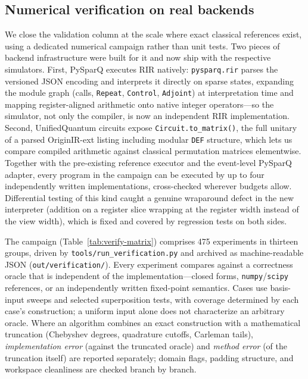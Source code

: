 \begin{table}[t]
\begin{tabular}{@{}p{4.3cm}cccc@{}}
  \end{tabular}
\end{table}

\subsection{Numerical verification on real backends}
\label{sec:numverify}

We close the validation column at the scale where exact classical
references exist, using a dedicated numerical campaign rather than unit
tests.  Two pieces of backend infrastructure were built for it and now ship
with the respective simulators.  First, PySparQ executes RIR natively:
\texttt{pysparq.rir} parses the versioned JSON encoding and interprets it
directly on sparse states, expanding the module graph (calls,
\texttt{Repeat}, \texttt{Control}, \texttt{Adjoint}) at interpretation time
and mapping register-aligned arithmetic onto native integer operators---so
the simulator, not only the compiler, is now an independent RIR
implementation.  Second, UnifiedQuantum circuits expose
\texttt{Circuit.to\_matrix()}, the full unitary of a parsed OriginIR-ext
listing including modular \texttt{DEF} structure, which lets us compare
compiled arithmetic against classical permutation matrices elementwise.
Together with the pre-existing reference executor and the event-level
PySparQ adapter, every program in the campaign can be executed by up to
four independently written implementations, cross-checked wherever budgets
allow.  Differential testing of this kind caught a genuine wraparound
defect in the new interpreter (addition on a register slice wrapping at the
register width instead of the view width), which is fixed and covered by
regression tests on both sides.

The campaign (Table~\ref{tab:verify-matrix}) comprises 475 experiments in
thirteen groups, driven by \texttt{tools/run\_verification.py} and archived
as machine-readable JSON (\texttt{out/verification/}).  Every experiment
compares against a correctness oracle that is independent of the
implementation---closed forms, \texttt{numpy}/\texttt{scipy} references, or
an independently written fixed-point semantics. Cases use basis-input
sweeps and selected superposition tests, with coverage determined by each
case's construction; a uniform input alone does not characterize an
arbitrary oracle. Where an algorithm combines an exact construction
with a mathematical truncation (Chebyshev degrees, quadrature cutoffs,
Carleman tails), \emph{implementation error} (against the truncated oracle)
and \emph{method error} (of the truncation itself) are reported separately;
domain flags, padding structure, and workspace cleanliness are checked
branch by branch.

